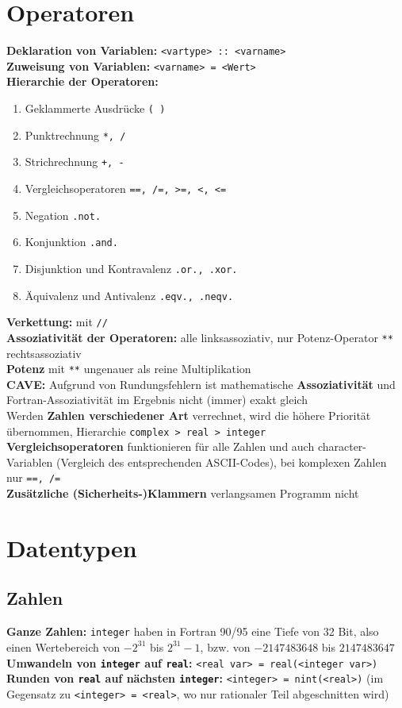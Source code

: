\documentclass[a4paper, twocolumn]{scrarticle}
\begin{document}
  \section{Operatoren}
  \textbf{Deklaration von Variablen:} \lstinline|<vartype> :: <varname>|\\
  \textbf{Zuweisung von Variablen:} \lstinline|<varname> = <Wert>|\\
  \textbf{Hierarchie der Operatoren:}
  \begin{enumerate}
    \item Geklammerte Ausdrücke \lstinline|( )|
    \item Punktrechnung \lstinline|*, /|
    \item Strichrechnung \lstinline|+, -|
    \item Vergleichsoperatoren \lstinline|==, /=, >=, <, <=|
    \item Negation \lstinline|.not.|
    \item Konjunktion \lstinline|.and.|
    \item Disjunktion und Kontravalenz \lstinline|.or., .xor.|
    \item Äquivalenz und Antivalenz \lstinline|.eqv., .neqv.|
  \end{enumerate}
  \textbf{Verkettung:} mit \lstinline|//|\\
  \textbf{Assoziativität der Operatoren:} alle linksassoziativ, nur Potenz-Operator \lstinline|**| rechtsassoziativ\\
  \textbf{Potenz} mit \lstinline|**| ungenauer als reine Multiplikation\\
  \textbf{CAVE:} Aufgrund von Rundungsfehlern ist mathematische \textbf{Assoziativität} und Fortran-Assoziativität im Ergebnis nicht (immer) exakt gleich \\
  Werden \textbf{Zahlen verschiedener Art} verrechnet, wird die höhere Priorität übernommen, Hierarchie \lstinline|complex > real > integer|\\
  \textbf{Vergleichsoperatoren} funktionieren für alle Zahlen und auch character-Variablen (Vergleich des entsprechenden ASCII-Codes), bei komplexen Zahlen nur \lstinline|==, /=|\\
  \textbf{Zusätzliche (Sicherheits-)Klammern} verlangsamen Programm nicht
  
  \section{Datentypen}
  \subsection{Zahlen}
  \textbf{Ganze Zahlen:} \lstinline|integer| haben in Fortran 90/95 eine Tiefe von 32 Bit, also einen Wertebereich von $-2^{31}$ bis $2^{31}-1$, bzw. von $-2147483648$ bis $2147483647$\\
  \textbf{Umwandeln von \lstinline|integer| auf \lstinline|real|:} \lstinline|<real var> = real(<integer var>)|\\
  \textbf{Runden von \lstinline|real| auf nächsten \lstinline|integer|:} \lstinline|<integer> = nint(<real>)| (im Gegensatz zu \lstinline|<integer> = <real>|, wo nur rationaler Teil abgeschnitten wird)
\end{document}
